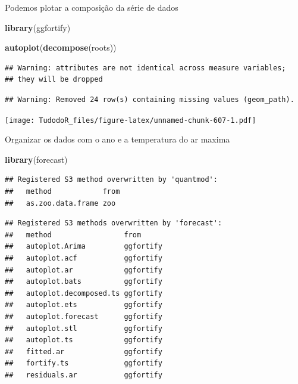 \documentclass[
]{book}
\newenvironment{Shaded}{\begin{snugshade}}{\end{snugshade}}
\newcommand{\KeywordTok}[1]{\textcolor[rgb]{0.13,0.29,0.53}{\textbf{#1}}}
\newcommand{\NormalTok}[1]{#1}
\begin{document}
Podemos plotar a composição da série de dados

\begin{Shaded}
\begin{Highlighting}[]
\KeywordTok{library}\NormalTok{(ggfortify)}
\end{Highlighting}
\end{Shaded}

\begin{Shaded}
\begin{Highlighting}[]
\KeywordTok{autoplot}\NormalTok{(}\KeywordTok{decompose}\NormalTok{(roots))}
\end{Highlighting}
\end{Shaded}

\begin{verbatim}
## Warning: attributes are not identical across measure variables;
## they will be dropped
\end{verbatim}

\begin{verbatim}
## Warning: Removed 24 row(s) containing missing values (geom_path).
\end{verbatim}

\texttt{[image: TudodoR\_files/figure-latex/unnamed-chunk-607-1.pdf]}

Organizar os dados com o ano e a temperatura do ar maxima

\begin{Shaded}
\begin{Highlighting}[]
\KeywordTok{library}\NormalTok{(forecast)}
\end{Highlighting}
\end{Shaded}

\begin{verbatim}
## Registered S3 method overwritten by 'quantmod':
##   method            from
##   as.zoo.data.frame zoo
\end{verbatim}

\begin{verbatim}
## Registered S3 methods overwritten by 'forecast':
##   method                 from     
##   autoplot.Arima         ggfortify
##   autoplot.acf           ggfortify
##   autoplot.ar            ggfortify
##   autoplot.bats          ggfortify
##   autoplot.decomposed.ts ggfortify
##   autoplot.ets           ggfortify
##   autoplot.forecast      ggfortify
##   autoplot.stl           ggfortify
##   autoplot.ts            ggfortify
##   fitted.ar              ggfortify
##   fortify.ts             ggfortify
##   residuals.ar           ggfortify
\end{verbatim}
\end{document}
